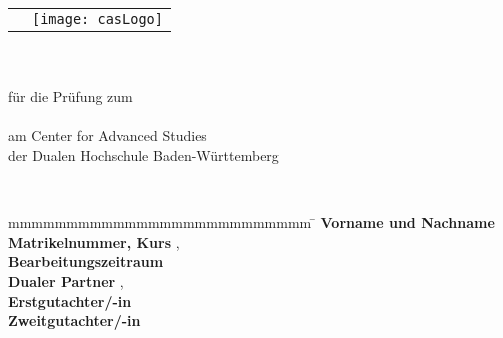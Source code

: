 \begin{titlepage}
	\begin{longtable}{p{8.2cm} p{5.4cm}}
		&
		\texttt{[image: casLogo]}
	\end{longtable}
	\addtocounter{table}{-1}
	\enlargethispage{20mm}
	\begin{center}
		\vspace*{12mm}	{\LARGE\textbf \myTitel }\\
		\vspace*{12mm}	{\large\textbf \myArbeit}\\
		\vspace*{3mm} für die Prüfung zum \\
		{\textbf \myDegree}\\
	\vspace*{3mm}		am Center for Advanced Studies\\
	der Dualen Hochschule Baden-Württemberg

		\vspace*{12mm}	\myDatum\\
	\end{center}
	\vspace*{42mm}
	\begin{spacing}{1.2}
	\begin{tabbing}
		mmmmmmmmmmmmmmmmmmmmmmmmmm     \= \kill
		\textbf{Vorname und Nachname}  \>  \myAutor\\
		\textbf{Matrikelnummer, Kurs}  \>  \myMatrikelnr, \myKurs\\
		\textbf{Bearbeitungszeitraum}  \>  \myBearbeitungszeit\\
		\textbf{Dualer Partner}        \>  \myFirma, \myFirmenort\\
		\textbf{Erstgutachter/-in} 	   \>  \myBetreuer\\
		\textbf{Zweitgutachter/-in}    \>  \myGutachter
	\end{tabbing}
	\end{spacing}
\end{titlepage}